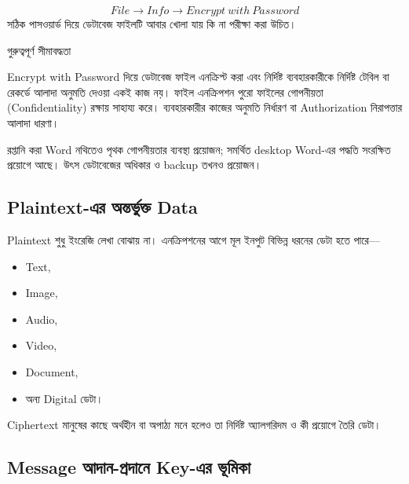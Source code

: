 \[
File
\rightarrow
Info
\rightarrow
Encrypt\ with\ Password
\]
সঠিক পাসওয়ার্ড দিয়ে ডেটাবেজ ফাইলটি আবার খোলা যায় কি না পরীক্ষা করা উচিত।

\begin{keypointbox}{গুরুত্বপূর্ণ সীমাবদ্ধতা}

Encrypt with Password দিয়ে ডেটাবেজ ফাইল এনক্রিপ্ট করা এবং নির্দিষ্ট ব্যবহারকারীকে নির্দিষ্ট টেবিল বা রেকর্ডে আলাদা অনুমতি দেওয়া একই কাজ নয়। ফাইল এনক্রিপশন পুরো ফাইলের গোপনীয়তা (Confidentiality) রক্ষায় সাহায্য করে। ব্যবহারকারীর কাজের অনুমতি নির্ধারণ বা Authorization নিরাপত্তার আলাদা ধারণা।

\end{keypointbox}



রপ্তানি করা Word নথিতেও পৃথক গোপনীয়তার ব্যবস্থা প্রয়োজন; সমর্থিত desktop Word-এর পদ্ধতি সংরক্ষিত প্রয়োগে আছে। উৎস ডেটাবেজের অধিকার ও backup তখনও প্রয়োজন।

\subsection{Plaintext-এর অন্তর্ভুক্ত Data}

Plaintext শুধু ইংরেজি লেখা বোঝায় না। এনক্রিপশনের আগে মূল ইনপুট বিভিন্ন ধরনের ডেটা হতে পারে—

\begin{itemize}
    \item Text,
    \item Image,
    \item Audio,
    \item Video,
    \item Document,
    \item অন্য Digital ডেটা।
\end{itemize}


Ciphertext মানুষের কাছে অর্থহীন বা অপাঠ্য মনে হলেও তা নির্দিষ্ট অ্যালগরিদম ও কী প্রয়োগে তৈরি ডেটা।



\subsection{Message আদান-প্রদানে Key-এর ভূমিকা}

